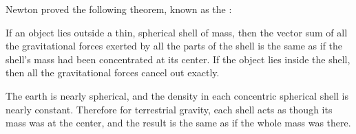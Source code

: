 Newton proved the following theorem, known as the :

If an object lies outside a thin, spherical shell of mass,
then the vector sum of all the gravitational forces exerted
by all the parts of the shell is the same as if the shell's
mass had been concentrated at its center.  If the object
lies inside the shell, then all the gravitational forces cancel out exactly.

The earth is nearly spherical, and the density in each concentric
spherical shell is nearly constant.  Therefore for terrestrial
gravity, each shell acts as though its mass was at the center, and the
result is the same as if the whole mass was there.

